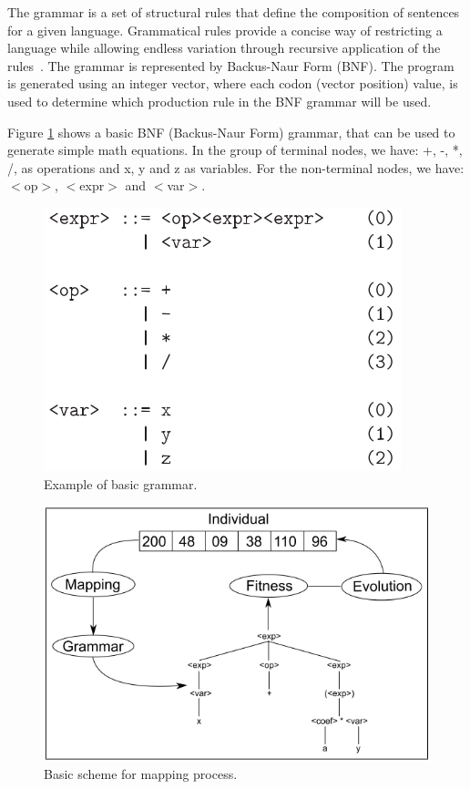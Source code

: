 \documentclass[conference,compsoc]{IEEEtran}
\begin{document}
The grammar is a set of structural rules that define the composition of sentences for a given language. Grammatical rules provide a concise way of restricting a language while allowing endless variation through recursive application of the rules~\cite{byrne2015optimising}. The grammar is represented by Backus-Naur Form (BNF). The program is generated using an integer vector, where each codon (vector position) value, is used to determine which production rule in the BNF grammar will be used.


Figure \ref{fig:grammar} shows a basic BNF (Backus-Naur Form) grammar, that can be used to generate simple math equations. In the group of terminal nodes, we have: +, -, *, /, as operations and x, y and z as variables. For the non-terminal nodes, we have: $<$op$>$, $<$expr$>$ and $<$var$>$.


\begin{figure}[!htb]
	\centering
	\includegraphics[scale=.6]{figures/grammar.png}
	\caption{Example of basic grammar.~\cite{ryan1998grammatical}}
	\label{fig:grammar}
\end{figure}


\begin{figure}[!htb]
	\centering
	\includegraphics[scale=.4]{figures/ge_algo.png}
	\caption{Basic scheme for mapping process.~\cite{cerri2013grammatical}}
	\label{fig:ge_algo}
\end{figure}
\end{document}
